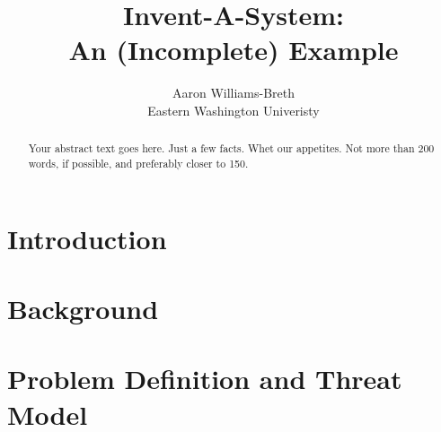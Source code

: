 \documentclass[letterpaper,twocolumn,10pt]{article}
\begin{document}

\date{}

\title{\Large \bf Invent-A-System:\\
  An (Incomplete) Example}

\author{
{\rm Aaron Williams-Breth}\\
Eastern Washington Univeristy
} %

\maketitle

\begin{abstract}
Your abstract text goes here. Just a few facts. Whet our appetites.
Not more than 200 words, if possible, and preferably closer to 150.
\end{abstract}


\section{Introduction}
\label{sec:intro}

 
\section{Background}
\label{sec:background}

 
\section{Problem Definition and Threat Model}
\label{sec:problem}

 
\end{document}
